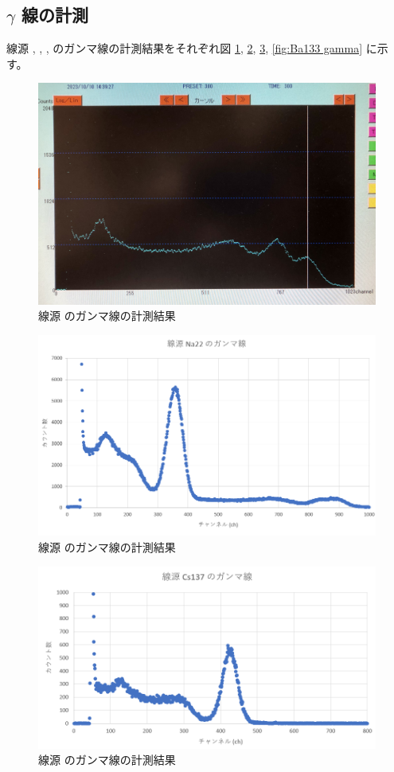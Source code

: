 \documentclass[uplatex,dvipdfmx,a4paper,11pt]{jlreq}
\numberwithin{equation}{section}
\theoremstyle{definition}
\begin{document}
\subsection{$\gamma$ 線の計測}
線源 , , ,  のガンマ線の計測結果をそれぞれ図 \ref{fig:Co60 gamma}, \ref{fig:Na22 gamma}, \ref{fig:Cs137 gamma}, \ref{fig:Ba133 gamma} に示す。
\begin{figure}[htbp]
  \centering
  \includegraphics[width=14cm]{./assets/Co60_gamma.jpg}
  \caption{線源  のガンマ線の計測結果}
  \label{fig:Co60 gamma}
\end{figure}
\begin{figure}[htbp]
  \centering
  \includegraphics[width=12cm]{./assets/Na22_gamma.png}
  \caption{線源  のガンマ線の計測結果}
  \label{fig:Na22 gamma}
\end{figure}
\begin{figure}[htbp]
  \centering
  \includegraphics[width=12cm]{./assets/Cs137_gamma.png}
  \caption{線源  のガンマ線の計測結果}
  \label{fig:Cs137 gamma}
\end{figure}
\end{document}
